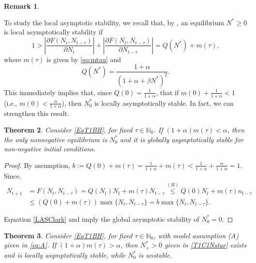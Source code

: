 \documentclass{article}
\newtheorem{theorem}{Theorem}
\numberwithin{theorem}{section}
\newtheorem{remark}[theorem]{Remark}
\begin{document}
{\begin{remark}
\end{remark}

To study the local asymptotic stability, we recall that, by \cite{Clark1976}, an equilibrium $N^*\geq 0$ is  local asymptotically stability if 
\begin{equation}\label{LASClark}
1>\left|\frac{\partial F(N_t,N_{t-\tau})}{\partial N_t}\right| +\left|\frac{\partial F(N_t,N_{t-\tau})}{\partial N_{t-\tau}}\right|= Q(N^*)+m(\tau),
\end{equation}
where $m(\tau)$ is given by \eqref{eq:mtau} and
\begin{equation*}
Q(N^*)=\frac{1 + \alpha}{(1 + \alpha + \beta N^*)^2}.
\end{equation*}
This immediately implies that, since $Q(0)=\frac{1}{1+\alpha}$, that if $m(0)+\frac{1}{1+\alpha}<1$ (i.e., $m(0)<\frac{\alpha}{1+\alpha}$), then $N^*_0$ is locally asymptotically stable. In fact, we can strengthen this result.

\begin{theorem}\label{thm:N0GAS}
    Consider \eqref{EqT1BH}, for fixed $\tau\in \mathbb{N}_0$.   
 If $(1+\alpha)m(\tau)<\alpha$, then the only nonnegative equilibrium is $N^*_0$ and it is globally asymptotically stable for non-negative initial conditions. 
\end{theorem}

\begin{proof}
By assumption, $b:=Q(0)+m(\tau)=\frac
{1}{1+\alpha}+m(\tau)<\frac{1}{1+\alpha}+\frac{\alpha}{1+\alpha}=1$. Since, 
\begin{align*}
    N_{t+1}&=F(N_t,N_{t-\tau})=Q(N_t)N_t+m(\tau)N_{t-\tau}\stackrel{(H)}{\leq} Q(0)N_t+m(\tau)n_{t-\tau}\\
    &\leq \left(Q(0)+m(\tau)\right)\max\{N_t, N_{t-\tau}\}=b\max\{N_t, N_{t-\tau}\}.
\end{align*}

Equation \eqref{LASClark} and \cite[Theorem~2]{LIZ2002} imply the global asymptotic stability of $N^*_0=0$.  
    
\end{proof}

\begin{theorem}\label{thm:NstarLAS}
 Consider \eqref{EqT1BH}, for fixed $\tau\in \mathbb{N}_0$, with model assumption (A) given in \eqref{eq:A}. 
 If $(1+\alpha)m(\tau)>\alpha$, then $N^*_+>0$ given in \eqref{T1C1Nstar} exists and is locally asymptotically stable, while $N^*_0$ is unstable. 
\end{theorem}

}
\end{document}
